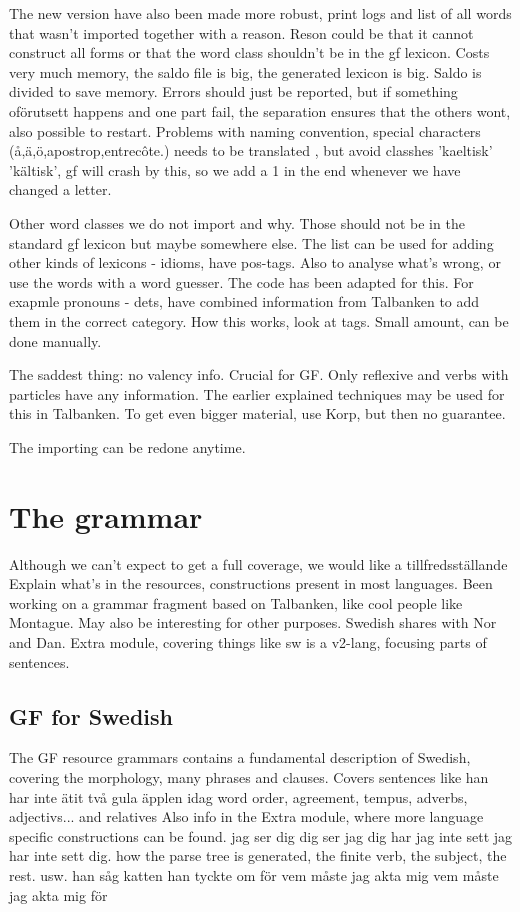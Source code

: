 \documentclass{report}
\begin{document}
The new version have also been made more robust, print logs and list of all
words that wasn't imported together with a reason. Reson could be that it
cannot construct all forms or that the word class shouldn't be in the gf lexicon.
Costs very much memory, the saldo file is big, the generated lexicon is big.
Saldo is divided to save memory. Errors should just be reported, but if something oförutsett
happens and one part fail, the separation ensures that the others wont, also
possible to restart. Problems with naming convention, special
characters (å,ä,ö,apostrop,entrecôte.) needs to be translated , but avoid
classhes 'kaeltisk' 'kältisk', gf will crash by this, so we add a 1
in the end whenever we have changed a letter.

Other word classes we do not import and why.
Those should not be in the standard gf lexicon but maybe somewhere else.
The list can be used for adding other kinds of lexicons - idioms, have pos-tags.
Also to analyse what's wrong, or use the words with a word guesser. The code
has been adapted for this.
For exapmle pronouns - dets, have combined information from Talbanken to add them in the correct
category. How this works, look at tags. Small amount, can be done manually.

The saddest thing: no valency info. Crucial for GF. Only reflexive and verbs with particles
have any information. The earlier explained techniques may be used for this in Talbanken.
To get even bigger material, use Korp, but then no guarantee.

The importing can be redone anytime.

\section{The grammar}
Although we can't expect to get a full coverage, we would like a tillfredsställande
Explain what's in the resources, constructions present in most languages. 
Been working on a grammar fragment based on Talbanken,
like cool people like Montague. May also be interesting for other purposes.
Swedish shares with Nor and Dan. Extra module, covering things like sw is a
v2-lang, focusing parts of sentences. 


\subsection{GF for Swedish}
The GF resource grammars contains a fundamental description of Swedish,
covering the morphology, many phrases and clauses.
Covers sentences like
han har inte ätit två gula äpplen idag
word order, agreement, tempus, adverbs, adjectivs...
and relatives
Also info in the Extra module, where more language specific constructions
can be found.
jag ser dig
dig ser jag
dig har jag inte sett
jag har inte sett dig.
how the parse tree is generated, the finite verb, the subject, the rest. usw.
han såg katten han tyckte om
för vem måste jag akta mig
vem måste jag akta mig för
\end{document}
